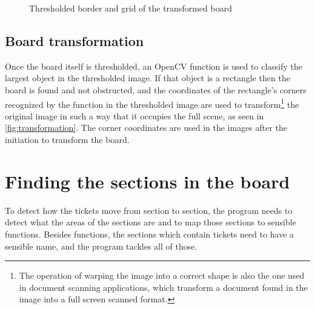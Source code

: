 \documentclass[12pt]{report}
\theoremstyle{definition}
\theoremstyle{remark}
\begin{document}
\begin{figure}[h]%
    \centering
    \qquad
    \caption{Thresholded border and grid of the transformed board}%
    \label{fig:thresholding}%
\end{figure}

\subsection{Board transformation}
Once the board itself is thresholded, an OpenCV function is used to classify the largest object in the thresholded image. If that object is a rectangle then the board is found and not obstructed, and the coordinates of the rectangle's corners recognized by the function in the thresholded image are used to transform\footnote{The operation of warping the image into a correct shape is also the one used in document scanning applications, which transform a document found in the image into a full screen scanned format\cite{doc_scan}.} the original image in such a way that it occupies the full scene, as seen in \autoref{fig:transformation}. The corner coordinates are used in the images after the initiation to transform the board.

\section{Finding the sections in the board}
\label{sec:finding_sec}
To detect how the tickets move from section to section, the program needs to detect what the areas of the sections are and to map those sections to sensible functions. Besides functions, the sections which contain tickets need to have a sensible name, and the program tackles all of those.
\end{document}
